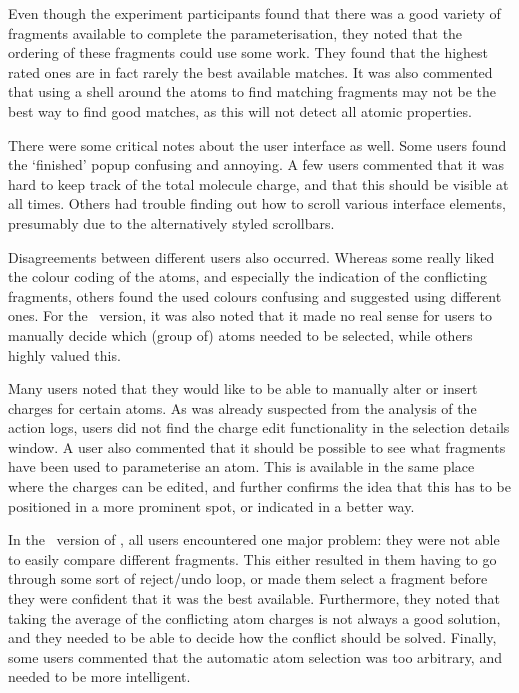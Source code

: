Even though the experiment participants found that there was a good variety of fragments available to complete the parameterisation, they noted that the ordering of these fragments could use some work. They found that the highest rated ones are in fact rarely the best available matches. It was also commented that using a shell around the atoms to find matching fragments may not be the best way to find good matches, as this will not detect all atomic properties.

There were some critical notes about the user interface as well. Some users found the `finished' popup confusing and annoying. A few users commented that it was hard to keep track of the total molecule charge, and that this should be visible at all times. Others had trouble finding out how to scroll various interface elements, presumably due to the alternatively styled scrollbars.

Disagreements between different users also occurred. Whereas some really liked the colour coding of the atoms, and especially the indication of the conflicting fragments, others found the used colours confusing and suggested using different ones. For the \IDa\ version, it was also noted that it made no real sense for users to manually decide which (group of) atoms needed to be selected, while others highly valued this.

Many users noted that they would like to be able to manually alter or insert charges for certain atoms. As was already suspected from the analysis of the action logs, users did not find the charge edit functionality in the selection details window. A user also commented that it should be possible to see what fragments have been used to parameterise an atom. This is available in the same place where the charges can be edited, and further confirms the idea that this has to be positioned in a more prominent spot, or indicated in a better way.

In the \IDb\ version of \oframp, all users encountered one major problem: they were not able to easily compare different fragments. This either resulted in them having to go through some sort of reject/undo loop, or made them select a fragment before they were confident that it was the best available. Furthermore, they noted that taking the average of the conflicting atom charges is not always a good solution, and they needed to be able to decide how the conflict should be solved. Finally, some users commented that the automatic atom selection was too arbitrary, and needed to be more intelligent.


